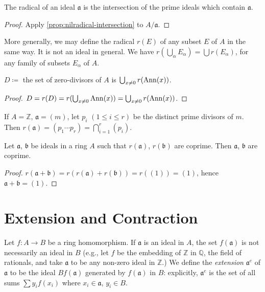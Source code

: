 \begin{proposition}\label{prop:radical-intersection-primes}
The radical of an ideal $\mathfrak{a}$ is the intersection of the prime ideals which contain $\mathfrak{a}$.
\end{proposition}

\begin{proof}
    Apply \eqref{prop:nilradical-intersection} to $A/\mathfrak{a}$.
\end{proof}

More generally, we may define the radical $r(E)$ of any subset $E$ of $A$ in the same way. It is not an ideal in general. We have $r(\bigcup_\alpha E_\alpha) = \bigcup r(E_\alpha)$, for any family of subsets $E_\alpha$ of $A$.

\begin{proposition}\label{prop:zerodivisors-union}
    $D\coloneqq$ the set of zero-divisors of $A$ is $\bigcup_{x \neq 0} r(\operatorname{Ann}(x))$.
\end{proposition}

\begin{proof}
$D = r(D) = r(\bigcup_{x \neq 0} \operatorname{Ann}(x)) = \bigcup_{x \neq 0} r(\operatorname{Ann}(x))$.
\end{proof}

\begin{example}
    If $A = \mathbb{Z}$, $\mathfrak{a} = (m)$, let $p_i$ $(1 \le i \le r)$ be the distinct prime divisors of $m$. Then $r(\mathfrak{a}) = (p_1 \cdots p_r) = \bigcap_{i=1}^{r} (p_i)$.
\end{example}

\begin{proposition}\label{prop:coprime-radicals}
    Let $\mathfrak{a}$, $\mathfrak{b}$ be ideals in a ring $A$ such that $r(\mathfrak{a})$, $r(\mathfrak{b})$ are coprime. Then $\mathfrak{a}$, $\mathfrak{b}$ are coprime.
\end{proposition}

\begin{proof}
$r(\mathfrak{a} + \mathfrak{b}) = r(r(\mathfrak{a}) + r(\mathfrak{b})) = r((1)) = (1)$, hence $\mathfrak{a} + \mathfrak{b} = (1)$.
\end{proof}

\section*{Extension and Contraction}

Let $f \colon A \to B$ be a ring homomorphism. If $\mathfrak{a}$ is an ideal in $A$, the set $f(\mathfrak{a})$ is not necessarily an ideal in $B$ (e.g., let $f$ be the embedding of $\mathbb{Z}$ in $\mathbb{Q}$, the field of rationals, and take $\mathfrak{a}$ to be any non-zero ideal in $\mathbb{Z}$.) We define the \emph{extension} $\mathfrak{a}^e$ of $\mathfrak{a}$ to be the ideal $Bf(\mathfrak{a})$ generated by $f(\mathfrak{a})$ in $B$: explicitly, $\mathfrak{a}^e$ is the set of all sums $\sum y_i f(x_i)$ where $x_i \in \mathfrak{a}$, $y_i \in B$.

